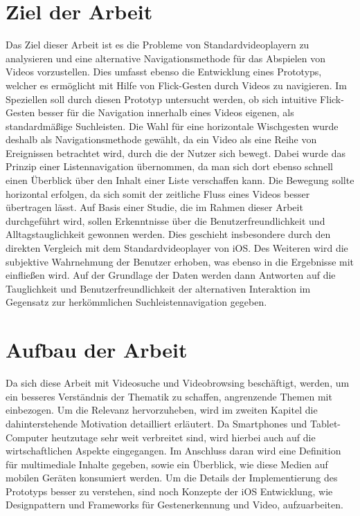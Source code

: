 \documentclass[11pt,a4paper]{report}
\begin{document}
\section{Ziel der Arbeit}

Das Ziel dieser Arbeit ist es die Probleme von Standardvideoplayern zu analysieren und eine alternative Navigationsmethode für das Abspielen von Videos vorzustellen. Dies umfasst ebenso die Entwicklung eines Prototyps, welcher es ermöglicht mit Hilfe von Flick-Gesten durch Videos zu navigieren. Im Speziellen soll durch diesen Prototyp untersucht werden, ob sich intuitive Flick-Gesten besser für die Navigation innerhalb eines Videos eigenen, als standardmäßige Suchleisten. Die Wahl für eine horizontale Wischgesten wurde deshalb als Navigationsmethode gewählt, da ein Video als eine Reihe von Ereignissen betrachtet wird, durch die der Nutzer sich bewegt. Dabei wurde das Prinzip einer Listennavigation übernommen, da man sich dort ebenso schnell einen Überblick über den Inhalt einer Liste verschaffen kann. Die Bewegung sollte horizontal erfolgen, da sich somit der zeitliche Fluss eines Videos besser übertragen lässt. Auf Basis einer Studie, die im Rahmen dieser Arbeit durchgeführt wird, sollen Erkenntnisse über die Benutzerfreundlichkeit und Alltagstauglichkeit gewonnen werden. Dies geschieht insbesondere durch den direkten Vergleich mit dem Standardvideoplayer von iOS. Des Weiteren wird die subjektive Wahrnehmung der Benutzer erhoben, was ebenso in die Ergebnisse mit einfließen wird. Auf der Grundlage der Daten werden dann Antworten auf die Tauglichkeit und Benutzerfreundlichkeit der alternativen Interaktion im Gegensatz zur herkömmlichen Suchleistennavigation gegeben.

\section{Aufbau der Arbeit}

Da sich diese Arbeit mit Videosuche und Videobrowsing beschäftigt, werden, um ein besseres Verständnis der Thematik zu schaffen, angrenzende Themen mit einbezogen. Um die Relevanz hervorzuheben, wird im zweiten Kapitel die dahinterstehende Motivation detailliert erläutert. Da Smartphones und Tablet-Computer heutzutage sehr weit verbreitet sind, wird hierbei auch auf die wirtschaftlichen Aspekte eingegangen. Im Anschluss daran wird eine Definition für multimediale Inhalte gegeben, sowie ein Überblick, wie diese Medien auf mobilen Geräten konsumiert werden. Um die Details der Implementierung des Prototyps besser zu verstehen, sind noch Konzepte der iOS Entwicklung, wie Designpattern und Frameworks für Gestenerkennung und Video, aufzuarbeiten.
\end{document}
